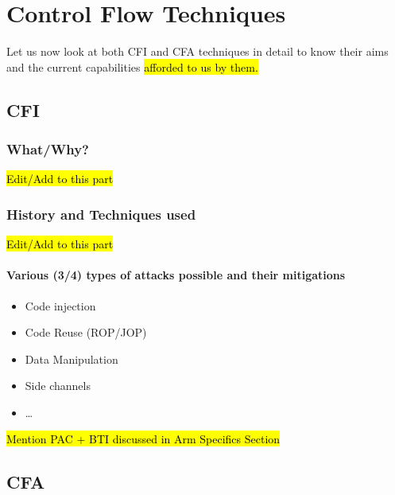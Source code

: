 \documentclass[a4paper, nobind]{templates/ociamthesis}
\providecommand{\tightlist}{%
  \setlength{\itemsep}{0pt}\setlength{\parskip}{0pt}}
\begin{document}
\section{Control Flow Techniques}\label{control-flow-techniques}

Let us now look at both CFI and CFA techniques in detail to know their aims and the current
capabilities \hl{afforded to us by them.}

\subsection{CFI}\label{cfi}

\subsubsection{What/Why?}\label{whatwhy}

\hl{Edit/Add to this part}

\subsubsection{History and Techniques used}\label{history-and-techniques-used}

\hl{Edit/Add to this part}

\paragraph{Various (3/4) types of attacks possible and their mitigations}\label{various-34-types-of-attacks-possible-and-their-mitigations}

\begin{itemize}
\tightlist
\item
  Code injection
\item
  Code Reuse (ROP/JOP)
\item
  Data Manipulation
\item
  Side channels
\item
  \ldots{}
\end{itemize}

\hl{Mention PAC + BTI discussed in Arm Specifics Section}

\subsection{CFA}\label{cfa}
\end{document}
